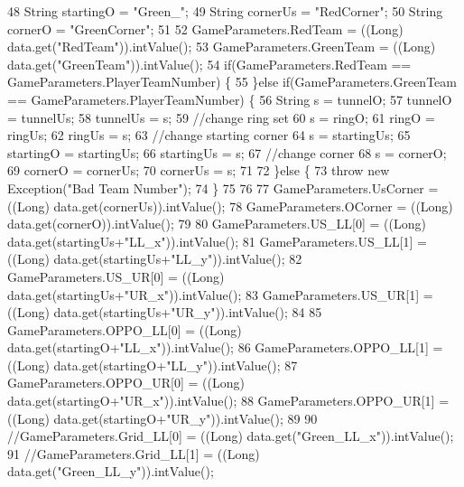 \begin{DoxyCode}
48       String startingO = \textcolor{stringliteral}{"Green\_"};
49       String cornerUs = \textcolor{stringliteral}{"RedCorner"};
50       String cornerO = \textcolor{stringliteral}{"GreenCorner"};
51       
52       GameParameters.RedTeam = ((Long) data.get(\textcolor{stringliteral}{"RedTeam"})).intValue();
53       GameParameters.GreenTeam = ((Long) data.get(\textcolor{stringliteral}{"GreenTeam"})).intValue();
54       \textcolor{keywordflow}{if}(GameParameters.RedTeam == GameParameters.PlayerTeamNumber) \{
55       \}\textcolor{keywordflow}{else} \textcolor{keywordflow}{if}(GameParameters.GreenTeam == GameParameters.PlayerTeamNumber) \{
56         String s = tunnelO;
57         tunnelO = tunnelUs;
58         tunnelUs = s;
59         \textcolor{comment}{//change ring set}
60         s = ringO;
61         ringO = ringUs;
62         ringUs = s;
63         \textcolor{comment}{//change starting corner}
64         s = startingUs;
65         startingO = startingUs;
66         startingUs = s;
67         \textcolor{comment}{//change corner}
68         s = cornerO;
69         cornerO = cornerUs;
70         cornerUs = s;
71         
72       \}\textcolor{keywordflow}{else} \{
73         \textcolor{keywordflow}{throw} \textcolor{keyword}{new} Exception(\textcolor{stringliteral}{"Bad Team Number"});
74       \}
75       
76       
77       GameParameters.UsCorner = ((Long) data.get(cornerUs)).intValue();
78       GameParameters.OCorner = ((Long) data.get(cornerO)).intValue();
79 
80       GameParameters.US\_LL[0] = ((Long) data.get(startingUs+\textcolor{stringliteral}{"LL\_x"})).intValue();
81       GameParameters.US\_LL[1] = ((Long) data.get(startingUs+\textcolor{stringliteral}{"LL\_y"})).intValue();
82       GameParameters.US\_UR[0] = ((Long) data.get(startingUs+\textcolor{stringliteral}{"UR\_x"})).intValue();
83       GameParameters.US\_UR[1] = ((Long) data.get(startingUs+\textcolor{stringliteral}{"UR\_y"})).intValue();
84 
85       GameParameters.OPPO\_LL[0] = ((Long) data.get(startingO+\textcolor{stringliteral}{"LL\_x"})).intValue();
86       GameParameters.OPPO\_LL[1] = ((Long) data.get(startingO+\textcolor{stringliteral}{"LL\_y"})).intValue();
87       GameParameters.OPPO\_UR[0] = ((Long) data.get(startingO+\textcolor{stringliteral}{"UR\_x"})).intValue();
88       GameParameters.OPPO\_UR[1] = ((Long) data.get(startingO+\textcolor{stringliteral}{"UR\_y"})).intValue();
89       
90       \textcolor{comment}{//GameParameters.Grid\_LL[0] = ((Long) data.get("Green\_LL\_x")).intValue();}
91       \textcolor{comment}{//GameParameters.Grid\_LL[1] = ((Long) data.get("Green\_LL\_y")).intValue();}

\end{DoxyCode}
